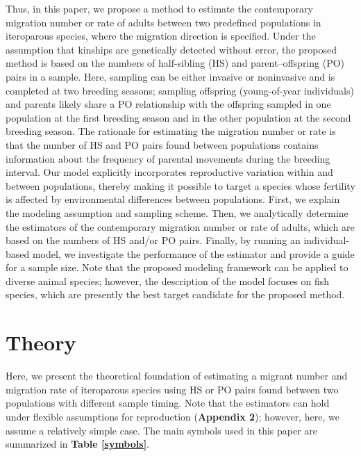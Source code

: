 \documentclass[12pt, English]{article}
\begin{document}
\begin{spacing}{1.9}

Thus, in this paper, we propose a method to estimate the contemporary migration number or rate of adults between two predefined populations in iteroparous species, where the migration direction is specified. Under the assumption that kinships are genetically detected without error, the proposed method is based on the numbers of half-sibling (HS) and parent--offspring (PO) pairs in a sample. Here, sampling can be either invasive or noninvasive and is completed at two breeding seasons; sampling offspring (young-of-year individuals) and parents likely share a PO relationship with the offspring sampled in one population at the first breeding season and in the other population at the second breeding season. The rationale for estimating the migration number or rate is that the number of HS and PO pairs found between populations contains information about the frequency of parental movements during the breeding interval. Our model explicitly incorporates reproductive variation within and between populations, thereby making it possible to target a species whose fertility is affected by environmental differences between populations. First, we explain the modeling assumption and sampling scheme. Then, we analytically determine the estimators of the contemporary migration number or rate of adults, which are based on the numbers of HS and/or PO pairs. Finally, by running an individual-based model, we investigate the performance of the estimator and provide a guide for a sample size. Note that the proposed modeling framework can be applied to diverse animal species; however, the description of the model focuses on fish species, which are presently the best target candidate for the proposed method.

\section{Theory}\label{sec2}
Here, we present the theoretical foundation of estimating a migrant number and migration rate of iteroparous species using HS or PO pairs found between two populations with different sample timing. Note that the estimators can hold under flexible assumptions for reproduction ({\bf Appendix 2}); however, here, we assume a relatively simple case. The main symbols used in this paper are summarized in {\bf Table \ref{symbols}}. 

\begin{center}
\end{center}


\end{spacing}
\end{document}
